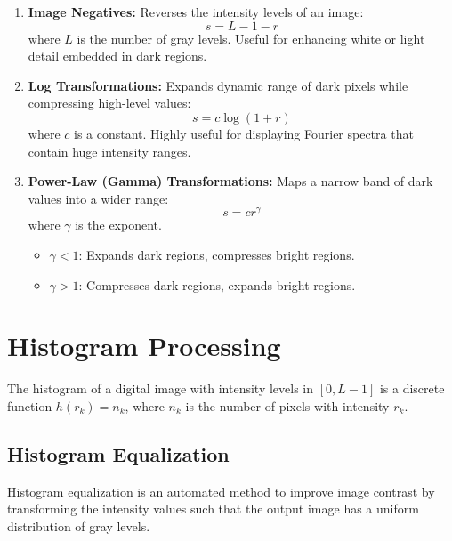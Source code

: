 \documentclass[12pt,a4paper]{article}
\begin{document}
\begin{tcolorbox}[defbox, title={Standard Gray Level Mapping Functions}]
\begin{enumerate}[label=\arabic*., leftmargin=*, itemsep=2.5pt]
  \item \textbf{Image Negatives:} Reverses the intensity levels of an image:
    \begin{equation}
      s = L - 1 - r
    \end{equation}
    where $L$ is the number of gray levels. Useful for enhancing white or light detail embedded in dark regions.
  \item \textbf{Log Transformations:} Expands dynamic range of dark pixels while compressing high-level values:
    \begin{equation}
      s = c \log(1 + r)
    \end{equation}
    where $c$ is a constant. Highly useful for displaying Fourier spectra that contain huge intensity ranges.
  \item \textbf{Power-Law (Gamma) Transformations:} Maps a narrow band of dark values into a wider range:
    \begin{equation}
      s = c r^\gamma
    \end{equation}
    where $\gamma$ is the exponent.
    \begin{itemize}[leftmargin=1em, itemsep=1pt]
      \item $\gamma < 1$: Expands dark regions, compresses bright regions.
      \item $\gamma > 1$: Compresses dark regions, expands bright regions.
    \end{itemize}
\end{enumerate}
\end{tcolorbox}

\section{Histogram Processing}

The histogram of a digital image with intensity levels in $[0, L-1]$ is a discrete function $h(r_k) = n_k$, where $n_k$ is the number of pixels with intensity $r_k$.

\subsection{Histogram Equalization}
Histogram equalization is an automated method to improve image contrast by transforming the intensity values such that the output image has a uniform distribution of gray levels.
\end{document}
